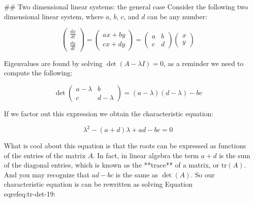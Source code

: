 \documentclass[
]{book}
\theoremstyle{definition}
\theoremstyle{definition}
\theoremstyle{definition}
\theoremstyle{remark}
\begin{document}
## Two dimensional linear systems: the general case
Consider the following two dimensional linear system, where $a$, $b$, $c$, and $d$ can be any number:

\begin{equation}
\begin{pmatrix} \frac{dx}{dt} \\ \frac{dy}{dt} \end{pmatrix} =  \begin{pmatrix} ax+by \\ cx+dy \end{pmatrix} =  \begin{pmatrix} a & b \\ c &  d \end{pmatrix} \begin{pmatrix} x \\ y \end{pmatrix}
\end{equation}

Eigenvalues are found by solving $\displaystyle \det (A - \lambda I ) =0$, as a reminder we need to compute the following:

\begin{equation}
\det \begin{pmatrix} a - \lambda & b \\ c & d-\lambda \end{pmatrix} = (a-\lambda)(d-\lambda) - bc
\end{equation}

If we factor out this expression we obtain the characteristic equation:

\begin{equation}
\lambda^{2} - (a+d) \lambda + ad - bc = 0
\end{equation}

What is cool about this equation is that the roots can be expressed as functions of the entries of the matrix $A$.  In fact, in linear algebra the term $a+d$ is the sum of the diagonal entries, which is known as the **trace** of a matrix, or $\mbox{tr}(A)$.  And you may recognize that $ad-bc$ is the same as $\det(A)$.  So our characteristic equation is can be rewritten as solving Equation \\eqref{eq:tr-det-19}:
\end{document}
